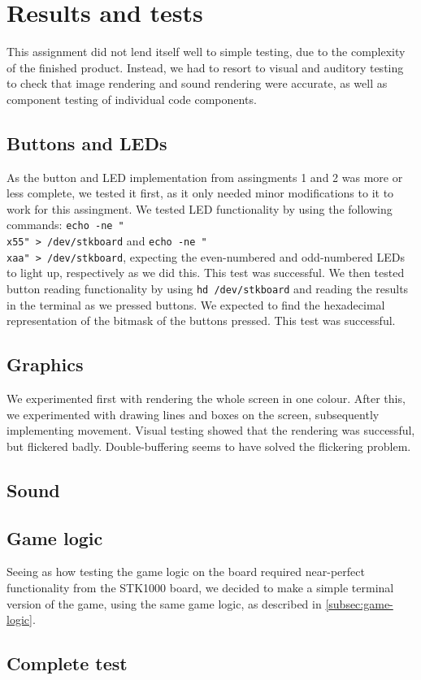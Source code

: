 \section{Results and tests}

This assignment did not lend itself well to simple testing, due to the complexity of the finished product. Instead, we had to resort to visual and auditory testing to check that image rendering and sound rendering were accurate, as well as component testing of individual code components.


\subsection{Buttons and LEDs}
As the button and LED implementation from assingments 1 and 2 was more or less complete, we tested it first, as it only needed minor modifications to it to work for this assingment.
We tested LED functionality by using the following commands:
\texttt{echo -ne "\\x55" > /dev/stkboard} and \texttt{echo -ne "\\xaa" > /dev/stkboard}, expecting the even-numbered and odd-numbered LEDs to light up, respectively as we did this. This test was successful.
We then tested button reading functionality by using \texttt{hd /dev/stkboard} and reading the results in the terminal as we pressed buttons. We expected to find the hexadecimal representation of the bitmask of the buttons pressed. This test was successful.
\subsection{Graphics}
We experimented first with rendering the whole screen in one colour. After this, we experimented with drawing lines and boxes on the screen, subsequently implementing movement. Visual testing showed that the rendering was successful, but flickered badly.
Double-buffering seems to have solved the flickering problem. %
\subsection{Sound}
\subsection{Game logic}
Seeing as how testing the game logic on the board required near-perfect functionality from the STK1000 board, we decided to make a simple terminal version of the game, using the same game logic, as described in \ref{subsec:game-logic}. 

\subsection{Complete test}